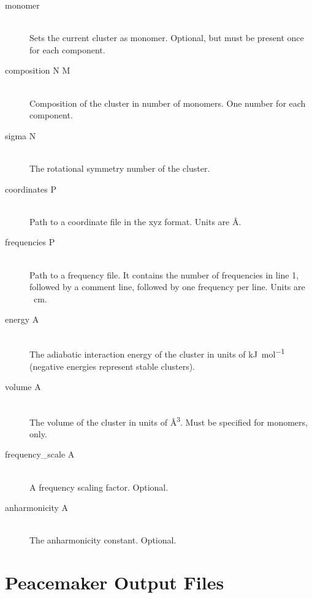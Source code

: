 \documentclass{scrartcl}
\begin{document}
\begin{description}
    \item[monomer] \hfill \\
        Sets the current cluster as monomer.
        Optional, but must be present once for each component.
        \vspace{0.1cm}
    \item[composition N M] \hfill \\
        Composition of the cluster in number of monomers.
        One number for each component.
        \vspace{0.1cm}
    \item[sigma N] \hfill \\
        The rotational symmetry number of the cluster.
        \vspace{0.1cm}
    \item[coordinates P] \hfill \\
        Path to a coordinate file in the xyz format.
        Units are \si{\angstrom}.
        \vspace{0.1cm}
    \item[frequencies P] \hfill \\
        Path to a frequency file.
        It contains the number of frequencies in line 1, followed by a comment line, followed by one frequency per line.
        Units are \si{\per\centi\meter}.
        \vspace{0.1cm}
    \item[energy A] \hfill \\
        The adiabatic interaction energy of the cluster in units of \si{\kilo\joule\per\mol} (negative energies represent stable clusters).
        \vspace{0.1cm}
    \item[volume A] \hfill \\
        The volume of the cluster in units of \si{\cubic\angstrom}.
        Must be specified for monomers, only.
        \vspace{0.1cm}
    \item[frequency\_scale A] \hfill \\
        A frequency scaling factor.
        Optional.
        \vspace{0.1cm}
    \item[anharmonicity A] \hfill \\
        The anharmonicity constant.
        Optional.
\end{description}

\section{Peacemaker Output Files}
\end{document}
